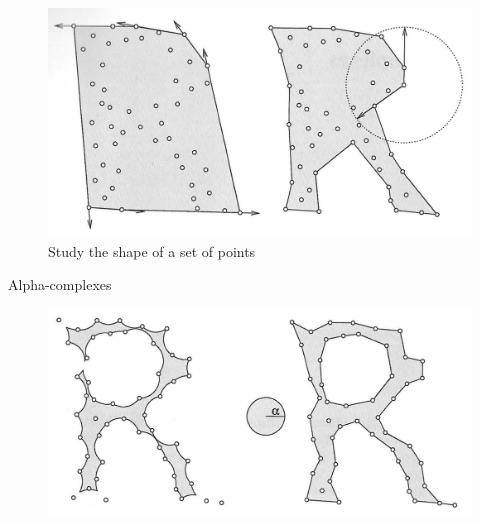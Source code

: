 \begin{frame}{}
        \begin{figure}
            \centering
            \includegraphics[width=\textwidth]{figs/L14-shape-of-a-set-of-points.jpg}
            \caption{Study the shape of a set of points\cite{edelsbrunner2014short}}
        \end{figure}
\end{frame}



\begin{frame}{Alpha-complexes \cite{Edelsbrunner2010,edelsbrunner1983shape}}
        \begin{figure}
            \centering
            \includegraphics[width=\textwidth]{figs/L14-alpha-hull-alpha-shape.jpg}
        \end{figure}
        
\end{frame}

